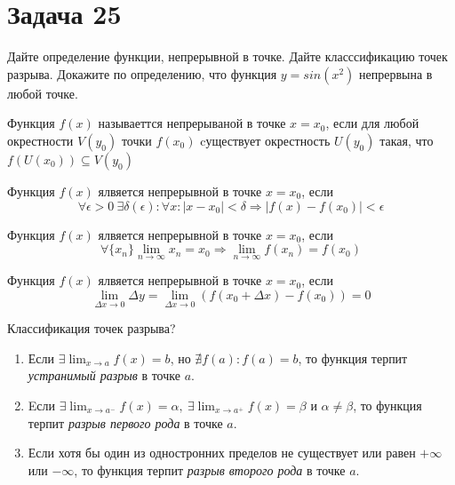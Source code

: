 \section*{Задача 25}
Дайте определение функции, непрерывной в точке. Дайте класссификацию точек разрыва. Докажите по определению, что функция $y = sin(x^2)$ непрервына в любой точке.

\begin{definition}
	Функция $f(x)$ называеттся непрерываной в точке $x = x_0$, если для любой окрестности $V(y_0)$ точки $f(x_0)$ cуществует окрестность $U(y_0)$ такая, что $f(U(x_0))\subseteq V(y_0)$
\end{definition}

\begin{definition}[по Коши]
	Функция $f(x)$ ялвяется непрерывной в точке $x = x_0$, если
	\[
	\forall \epsilon > 0 \ \exists \delta(\epsilon): 
	\forall x: |x - x_0| < \delta \Rightarrow |f(x) - f(x_0)| < \epsilon
	\]
\end{definition}

\begin{definition}[по Гейне]
	Функция $f(x)$ ялвяется непрерывной в точке $x = x_0$, если
	\[
	\forall \{x_n\} \lim_{n \rightarrow \infty} x_n = x_0 \Rightarrow \lim_{n \rightarrow \infty} f(x_n) = f(x_0)
	\]
\end{definition}
\begin{definition}
	Функция $f(x)$ ялвяется непрерывной в точке $x = x_0$, если
	\[
	\lim_{\Delta x \rightarrow 0} \Delta y = \lim_{\Delta x \rightarrow 0} \left(f(x_0 + \Delta x) - f(x_0) \right) = 0
	\]
\end{definition}


Классификация точек разрыва?
\begin{enumerate}
	\item Если $\exists \lim_{x \rightarrow a} f(x) = b$, но $\nexists f(a): f(a) = b$, то функция терпит \textit{устранимый разрыв} в точке $a$.
	
	\item Eсли $\exists \lim_{x \rightarrow a^{-}} f(x) = \alpha, \ \exists \lim_{x \rightarrow a^{+}} f(x) = \beta$ и $\alpha \neq \beta$, то функция терпит \textit{разрыв первого рода} в точке $a$.
	
	\item Если хотя бы один из одностронних пределов не существует или равен $+ \infty$ или $-\infty$, то функция терпит \textit{разрыв второго рода} в точке $a$.
\end{enumerate}


